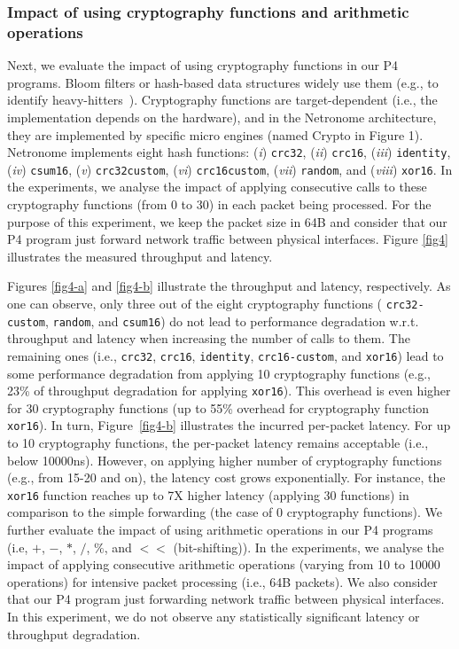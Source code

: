\subsubsection{Impact of using cryptography functions and arithmetic operations}

Next, we evaluate the impact of using  cryptography functions in our P4 programs. Bloom filters or hash-based data structures widely use them (e.g., to identify heavy-hitters~\cite{hhh-sigcomm}). Cryptography functions are target-dependent (i.e., the implementation depends on the hardware), and in the Netronome architecture, they are implemented by specific micro engines (named Crypto in Figure 1).
%
Netronome implements eight hash functions: (\textit{i}) \texttt{crc32}, (\textit{ii}) \texttt{crc16}, (\textit{iii}) \texttt{identity}, (\textit{iv}) \texttt{csum16}, (\textit{v}) \texttt{crc32custom}, (\textit{vi}) \texttt{crc16custom}, (\textit{vii}) \texttt{random}, and (\textit{viii}) \texttt{xor16}. In the experiments, we analyse the impact of applying consecutive calls to these cryptography functions (from 0 to 30) in each packet being processed. For the purpose of this experiment, we keep the packet size in 64B and consider that our P4 program just forward network traffic between physical interfaces. Figure \ref{fig4} illustrates the measured throughput and latency. 

Figures \ref{fig4-a} and \ref{fig4-b} illustrate the throughput and latency, respectively. As one can observe, only three out of the eight cryptography functions ( \texttt{crc32-custom}, \texttt{random}, and \texttt{csum16}) do not lead to performance degradation w.r.t. throughput and latency when increasing the number of calls to them. The remaining ones (i.e., \texttt{crc32}, \texttt{crc16}, \texttt{identity}, \texttt{crc16-custom}, and \texttt{xor16}) lead to some performance degradation from applying 10 cryptography functions (e.g., 23\% of throughput degradation for applying \texttt{xor16}). This overhead is even higher for 30 cryptography functions (up to 55\% overhead for cryptography function \texttt{xor16}). In turn, Figure~\ref{fig4-b} illustrates the incurred per-packet latency. For up to 10 cryptography functions, the per-packet latency remains acceptable (i.e., below 10000ns). However, on applying higher number of cryptography functions (e.g., from 15-20 and on), the latency cost grows exponentially. For instance, the \texttt{xor16} function reaches up to 7X higher latency (applying 30 functions) in comparison to the simple forwarding (the case of 0 cryptography functions). We further evaluate the impact of using arithmetic operations in our P4 programs (i.e, $+$, $-$, $*$, $/$, $\%$, and $<<$ (bit-shifting)). In the experiments, we analyse the impact of applying consecutive arithmetic operations (varying from 10 to 10000 operations) for intensive packet processing (i.e., 64B packets). We also consider that our P4 program just forwarding network traffic between physical interfaces. In this experiment, we do not observe any statistically significant latency or throughput degradation.


